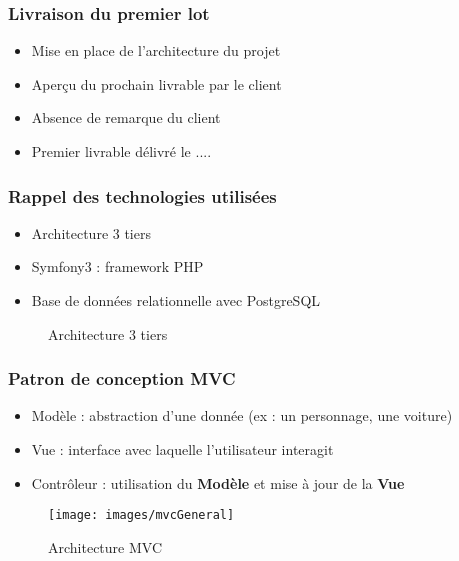 
\speaker{\Kafui}
\begin{frame}
  \frametitle{Livraison du premier lot}
  \begin{block}{}
  \begin{itemize}
	\item Mise en place de l'architecture du projet
	\item Aperçu du prochain livrable par le client
	\item Absence de remarque du client
	\item Premier livrable délivré le ....
  \end{itemize}
  \end{block}
\end{frame}

\begin{frame}
  \frametitle{Rappel des technologies utilisées}
  \begin{block}{}
  \begin{itemize}
	\item Architecture 3 tiers
	\item Symfony3 : framework PHP 
	\item Base de données relationnelle avec PostgreSQL
  \end{itemize}

  \begin{figure}[!h]
	\begin{center}
	
	\caption{\label{3tiers_schema} Architecture 3 tiers}
	\end{center}
  \end{figure}
  \end{block}
\end{frame}

\begin{frame}
  \frametitle{Patron de conception MVC}
  \begin{block}{}
  \begin{itemize}
	\item Modèle : abstraction d'une donnée (ex : un personnage, une voiture)
	\item Vue : interface avec laquelle l'utilisateur interagit
	\item Contrôleur : utilisation du \textbf{Modèle} et mise à jour de la \textbf{Vue}
	
  \end{itemize}

\begin{figure}[!h]
	\begin{center}
	\texttt{[image: images/mvcGeneral]}
	\caption{Architecture MVC}
	\end{center}
\end{figure}
\end{block}
\end{frame}

